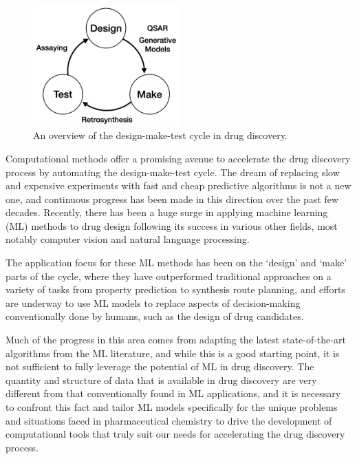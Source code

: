 \begin{figure}[!h] %
 \centering
 \includegraphics[width=0.5\textwidth]{Chapters/Intro/Figs/design-make-test.png}
 \caption{\label{fig:cycle} An overview of the design-make-test cycle in drug discovery.}
\end{figure}

Computational methods offer a promising avenue to accelerate the drug discovery process by automating the design-make-test cycle. The dream of replacing slow and expensive experiments with fast and cheap predictive algorithms is not a new one, and continuous progress has been made in this direction over the past few decades. Recently, there has been a huge surge in applying machine learning (ML) methods to drug design following its success in various other fields, most notably computer vision and natural language processing.

The application focus for these ML methods has been on the `design' and `make' parts of the cycle, where they have outperformed traditional approaches on a variety of tasks from property prediction to synthesis route planning, and efforts are underway to use ML models to replace aspects of decision-making conventionally done by humans, such as the design of drug candidates.

Much of the progress in this area comes from adapting the latest state-of-the-art algorithms from the ML literature, and while this is a good starting point, it is not sufficient to fully leverage the potential of ML in drug discovery. The quantity and structure of data that is available in drug discovery are very different from that conventionally found in ML applications, and it is necessary to confront this fact and tailor ML models specifically for the unique problems and situations faced in pharmaceutical chemistry to drive the development of computational tools that truly suit our needs for accelerating the drug discovery process.

